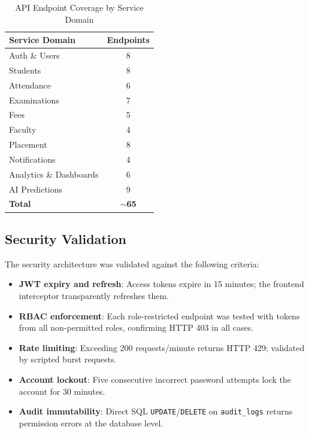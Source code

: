 \documentclass[conference]{IEEEtran}
\begin{document}
\begin{table}[htbp]
\caption{API Endpoint Coverage by Service Domain}
\label{tab:api}
\centering
\begin{tabular}{lc}
\toprule
\textbf{Service Domain} & \textbf{Endpoints} \\
\midrule
Auth \& Users          & 8  \\
Students               & 8  \\
Attendance             & 6  \\
Examinations           & 7  \\
Fees                   & 5  \\
Faculty                & 4  \\
Placement              & 8  \\
Notifications          & 4  \\
Analytics \& Dashboards& 6  \\
AI Predictions         & 9  \\
\midrule
\textbf{Total}         & \textbf{$\sim$65} \\
\bottomrule
\end{tabular}
\end{table}

\subsection{Security Validation}

The security architecture was validated against the following criteria:

\begin{itemize}
  \item \textbf{JWT expiry and refresh}: Access tokens expire in 15 minutes;
    the frontend interceptor transparently refreshes them.
  \item \textbf{RBAC enforcement}: Each role-restricted endpoint was tested
    with tokens from all non-permitted roles, confirming HTTP 403 in all cases.
  \item \textbf{Rate limiting}: Exceeding 200 requests/minute returns HTTP 429;
    validated by scripted burst requests.
  \item \textbf{Account lockout}: Five consecutive incorrect password attempts
    lock the account for 30 minutes.
  \item \textbf{Audit immutability}: Direct SQL \texttt{UPDATE}/\texttt{DELETE}
    on \texttt{audit\_logs} returns permission errors at the database level.
\end{itemize}
\end{document}
